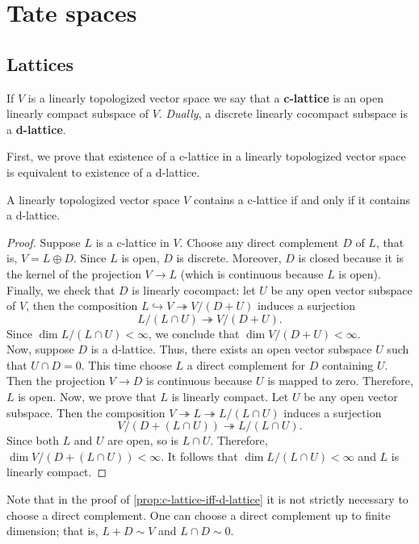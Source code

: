 \section{Tate spaces}
\subsection{Lattices}
\begin{definition}\label{def:c-lattice}
	If $V$ is a linearly topologized vector space we say that a \textbf{c-lattice} is an open linearly compact subspace of $V$. \textit{Dually}, a discrete linearly cocompact subspace is a \textbf{d-lattice}.
\end{definition}
First, we prove that existence of a c-lattice in a linearly topologized vector space is equivalent to existence of a d-lattice.
\begin{proposition}\label{prop:c-lattice-iff-d-lattice}
	A linearly topologized vector space $V$ contains a c-lattice if and only if it contains a d-lattice. 
\end{proposition}
\begin{proof}
	Suppose $L$ is a c-lattice in $V$. Choose any direct complement $D$ of $L$, that is, $V = L \oplus D$. Since $L$ is open, $D$ is discrete. Moreover, $D$ is closed because it is the kernel of the projection $V \to L$ (which is continuous because $L$ is open). Finally, we check that $D$ is linearly cocompact: let $U$ be any open vector subspace of $V$, then the composition $L \hookrightarrow V \twoheadrightarrow V/(D+U)$ induces a surjection 
	\[
		L/(L \cap U) \twoheadrightarrow V/(D+U).
	\]
	Since $\dim L / (L \cap U) < \infty$, we conclude that $\dim V/(D+U) < \infty$. \\
	Now, suppose $D$ is a d-lattice. Thus, there exists an open vector subspace $U$ such that $U \cap D = 0$. This time choose $L$ a direct complement for $D$ containing $U$. Then the projection $V \to D$ is continuous because $U$ is mapped to zero. Therefore, $L$ is open. Now, we prove that $L$ is linearly compact. Let $U$ be any open vector subspace. Then the composition $V \twoheadrightarrow L \twoheadrightarrow L/(L \cap U)$ induces a surjection
	 \[
	 	V/(D + (L \cap U)) \twoheadrightarrow L/(L \cap U).
	 \]
	 Since both $L$ and $U$ are open, so is $L\cap U$. Therefore, $\dim V/(D + (L \cap U)) < \infty$. It follows that $\dim L/(L \cap U) < \infty$ and $L$ is linearly compact.  
\end{proof}
\begin{remark}\label{up-to-finite-dimension}
	Note that in the proof of \cref{prop:c-lattice-iff-d-lattice} it is not strictly necessary to choose a direct complement. One can choose a direct complement up to finite dimension; that is, $L + D \sim V$ and $L \cap D \sim 0$. 
\end{remark}

